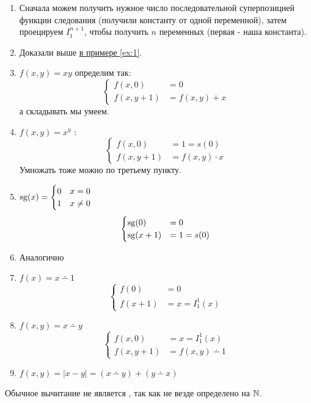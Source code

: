 \begin{proof*}
	\begin{enumerate}
		\item Сначала можем получить нужное число последовательной суперпозицией функции следования (получили константу от одной переменной), затем проецируем $ I^{n + 1}_{1}$, чтобы получить $ n$ переменных (первая - наша константа).
		\item Доказали выше \hyperref[ex:1]{в примере \ref{ex:1}}.
		\item $ f(x, y) = xy$ определим так:
			\[
			\begin{cases}
				f(x, 0) &= 0\\
				f(x, y+1) &= f(x, y) + x
			\end{cases}
			\] 
			а складывать мы умеем.
		\item $ f(x, y) = x^{y}$ :
			\[
			\begin{cases}
				f(x, 0) &= 1 = s(0) \\
				f(x, y+1) &= f(x, y) \cdot  x
			\end{cases}
			\] 
			Умножать тоже можно по третьему пункту.
		\item  $ \operatorname{sg}(x) = \begin{cases}
				0&x=0 \\
				1& x\ne 0
		\end{cases}$
		\[
		\begin{cases}
			\operatorname{sg}(0) &= 0 \\
			\operatorname{sg}(x+1) &= 1 = s(0)
		\end{cases}
		\] 
	\item Аналогично
	\item $ f(x) = x \dotminus 1$ 
		\[
		\begin{cases}
			f(0) &=0 \\
			f(x+1) &= x = I^{1}_{1} (x)
		\end{cases}
		\] 
	\item $ f(x, y) = x \dotminus y$
		\[
		\begin{cases}
			f(x, 0) &= x = I^{1}_{1}(x)  \\
			f(x, y+1) &= f(x, y) \dotminus 1
		\end{cases}
		\] 
	\item $ f(x, y) = \lvert x - y \rvert  = (x \dotminus y) + (y \dotminus x)$
    \end{enumerate}
\end{proof*}
\begin{note}
    Обычное вычитание не является \prf, так как не везде определено на $ \mathbb{N}$.
\end{note}



